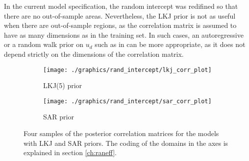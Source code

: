 In the current model specification, the random intercept was redifined so that there are no out-of-sample areas.
Nevertheless, the LKJ prior is not as useful when there are out-of-sample regions, as the correlation matrix is assumed to have as many dimensions as in the training set.
In such cases, an autoregressive or a random walk prior on $u_d$ such as in \cite{gao_improving_2021} can be more appropriate, as it does not depend strictly on the dimensions of the correlation matrix.

\begin{figure}
    \begin{subfigure}{\linewidth}
        \centering
        \texttt{[image: ./graphics/rand\_intercept/lkj\_corr\_plot]}
        \caption{LKJ(5) prior}
    \end{subfigure}
    \begin{subfigure}{\linewidth}
        \centering
        \texttt{[image: ./graphics/rand\_intercept/sar\_corr\_plot]}
        \caption{SAR prior}
    \end{subfigure}
    \caption[Correlation matrices for the LKJ and SAR priors.]{Four samples of the posterior correlation matrices for the models with LKJ and SAR priors. The coding of the domains in the axes is explained in section \ref{ch:raneff}.}
    \label{fig:corr_heatmap}
\end{figure}


